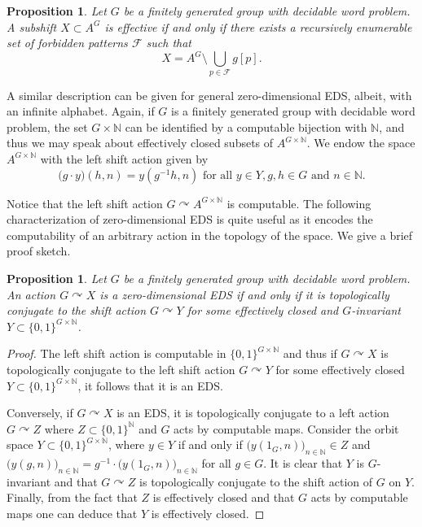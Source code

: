 \documentclass{article}
\newtheorem{proposition}[theorem]{Proposition}
\theoremstyle{definition}
\theoremstyle{plain}
\newcommand{\NN}{\mathbb{N}}
\newcommand{\FF}{\mathcal{F}}
\begin{document}
\begin{proposition}
    Let $G$ be a finitely generated group with decidable word problem. A subshift $X\subset A^G$ is effective if and only if there exists a recursively enumerable set of forbidden patterns $\FF$ such that \[ X = A^G\setminus \bigcup_{p \in \FF}g[p].   \]
\end{proposition}

A similar description can be given for general zero-dimensional EDS, albeit, with an infinite alphabet. Again, if $G$ is a finitely generated group with decidable word problem, the set $G\times \NN$ can be identified by a computable bijection with $\NN$, and thus we may speak about effectively closed subsets of $A^{G\times \NN}$. We endow the space $A^{G\times \NN}$ with the left shift action given by \[ \bigl(g\cdot y\bigr)(h,n) = y(g^{-1}h,n) \mbox{ for all } y \in Y, g,h \in G \mbox{ and } n \in \NN.   \]

Notice that the left shift action $G\curvearrowright A^{G\times \NN}$ is computable. The following characterization of zero-dimensional EDS is quite useful as it encodes the computability of an arbitrary action in the topology of the space. We give a brief proof sketch.

\begin{proposition}\label{prop:orbitrep}
    Let $G$ be a finitely generated group with decidable word problem. An action $G\curvearrowright X$ is a zero-dimensional EDS if and only if it is topologically conjugate to the shift action $G\curvearrowright Y$ for some effectively closed and $G$-invariant $Y\subset \{0,1\}^{G\times \NN}$.
\end{proposition}

\begin{proof}
    The left shift action is computable in $\{0,1\}^{G\times \NN}$ and thus if $G\curvearrowright X$ is topologically conjugate to the left shift action $G\curvearrowright Y$ for some effectively closed $Y\subset \{0,1\}^{G\times \NN}$, it follows that it is an EDS.

    Conversely, if $G\curvearrowright X$ is an EDS, it is topologically conjugate to a left action $G\curvearrowright Z$ where $Z\subset \{0,1\}^{\NN}$ and $G$ acts by computable maps. Consider the orbit space $Y\subset \{0,1\}^{G\times \NN}$, where $y \in Y$ if and only if $\bigl(y(1_G,n)\bigr)_{n \in \NN} \in Z$ and  $\bigl(y(g,n)\bigr)_{n \in \NN} = g^{-1} \cdot \bigl(y(1_G,n)\bigr)_{n \in \NN}$ for all $g \in G$.  
    It is clear that $Y$ is $G$-invariant and that $G\curvearrowright Z$ is topologically conjugate to the shift action of $G$ on $Y$. Finally, from the fact that $Z$ is effectively closed and that $G$ acts by computable maps one can deduce that $Y$ is effectively closed.\end{proof}
    
\end{document}
